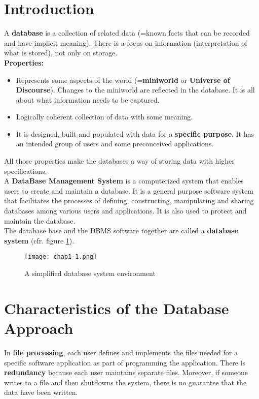 \section{Introduction}

A \textbf{database} is a collection of related data (=known facts that can be recorded and have implicit meaning). There is a focus on information (interpretation of what is stored), not only on storage.\\

\textbf{Properties:}
\begin{itemize}
    \item Represents some aspects of the world (=\textbf{miniworld} or \textbf{Universe of Discourse}). Changes to the miniworld are reflected in the database. It is all about what information needs to be captured.
    \item Logically coherent collection of data with some meaning.
    \item It is designed, built and populated with data for a \textbf{specific purpose}. It has an intended group of users and some preconceived applications.
\end{itemize}

All those properties make the databases a way of storing data with higher specifications.\\

A \textbf{DataBase Management System} is a computerized system that enables users to create and maintain a database. It is a general purpose software system that facilitates the processes of defining, constructing, manipulating and sharing databases among various users and applications. It is also used to protect and maintain the database.\\

The database base and the DBMS software together are called a \textbf{database system} (cfr. figure \ref{fig:databaseSystem}).

\begin{figure}[!h]
    \centering
    \texttt{[image: chap1-1.png]}
    \caption{A simplified database system environment}
    \label{fig:databaseSystem}
\end{figure}

\section{Characteristics of the Database Approach}

In \textbf{file processing}, each user defines and implements the files needed for a specific software application as part of programming the application. There is \textbf{redundancy} because each user maintains separate files. Moreover, if someone writes to a file and then shutdowns the system, there is no guarantee that the data have been written.\\

